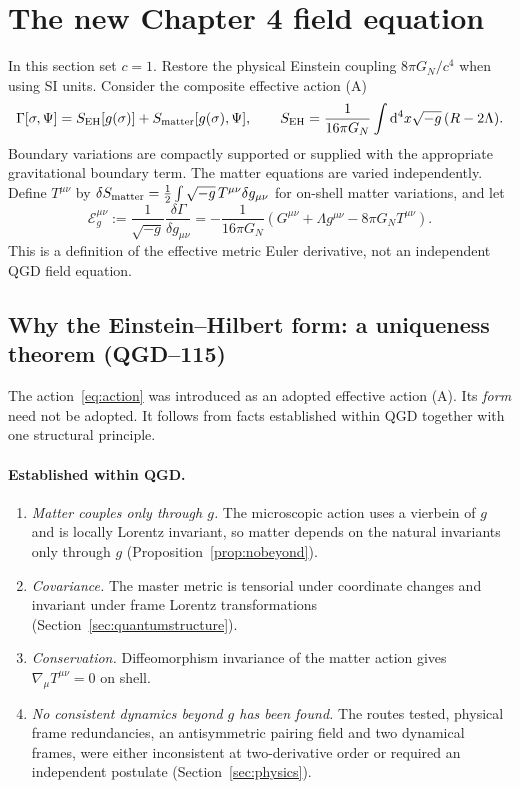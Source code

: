 \documentclass[11pt,a4paper]{article}
\newcommand{\dd}{\mathrm d}
\newcommand{\cE}{\mathcal E}
\begin{document}
\section{The new Chapter 4 field equation}
\label{sec:balance}
In this section set $c=1$. Restore the physical Einstein coupling
$8\pi G_N/c^4$ when using SI units. Consider the composite effective
action (A)
\begin{equation}\label{eq:action}
\Gamma[\sigma,\Psi]=S_{\rm EH}[g(\sigma)]
+S_{\rm matter}[g(\sigma),\Psi],\qquad
S_{\rm EH}=\frac{1}{16\pi G_N}
\int\dd^4x\sqrt{-g}\,(R-2\Lambda).
\end{equation}
Boundary variations are compactly supported or supplied with the
appropriate gravitational boundary term. The matter equations are
varied independently. Define $T^{\mu\nu}$ by
$\delta S_{\rm matter}=\frac12\int\sqrt{-g}\,
T^{\mu\nu}\delta g_{\mu\nu}$ for on-shell matter variations, and let
\begin{equation}\label{eq:Eg}
\boxed{\cE_g^{\mu\nu}:=\frac1{\sqrt{-g}}
\frac{\delta\Gamma}{\delta g_{\mu\nu}}
=-\frac{1}{16\pi G_N}
\left(G^{\mu\nu}+\Lambda g^{\mu\nu}
-8\pi G_N T^{\mu\nu}\right).}
\end{equation}
This is a definition of the effective metric Euler derivative,
not an independent QGD field equation.

\subsection{Why the Einstein--Hilbert form: a uniqueness theorem (QGD--115)}
\label{sec:lovelock}
The action~\eqref{eq:action} was introduced as an adopted effective action (A).
Its \emph{form} need not be adopted. It follows from facts established within QGD
together with one structural principle.

\paragraph{Established within QGD.}
\begin{enumerate}
\item[(i)] \emph{Matter couples only through $g$.} The microscopic action uses a
vierbein of $g$ and is locally Lorentz invariant, so matter depends on the natural
invariants only through $g$ (Proposition~\ref{prop:nobeyond}).
\item[(ii)] \emph{Covariance.} The master metric is tensorial under coordinate
changes and invariant under frame Lorentz transformations
(Section~\ref{sec:quantumstructure}).
\item[(iii)] \emph{Conservation.} Diffeomorphism invariance of the matter action
gives $\nabla_\mu T^{\mu\nu}=0$ on shell.
\item[(iv)] \emph{No consistent dynamics beyond $g$ has been found.} The routes
tested, physical frame redundancies, an antisymmetric pairing field and two
dynamical frames, were either inconsistent at two-derivative order or required an
independent postulate (Section~\ref{sec:physics}).
\end{enumerate}
\end{document}

